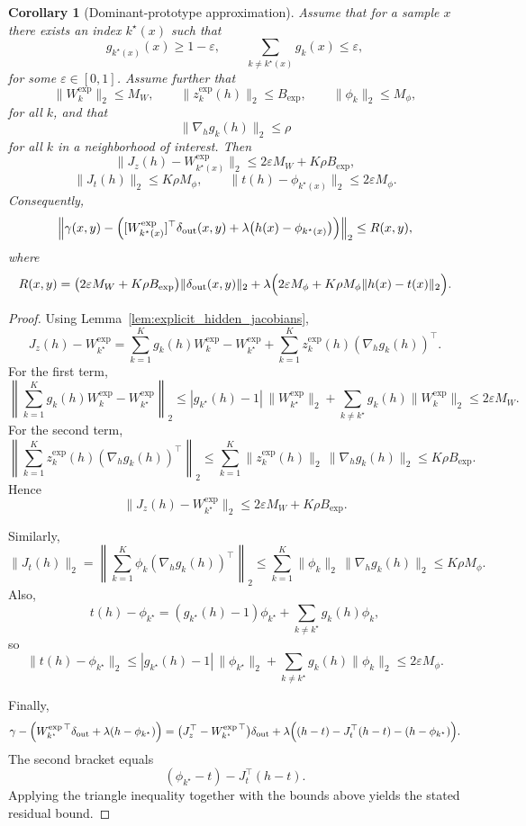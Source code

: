 \documentclass{article}
\newtheorem{cor}[thm]{Corollary}
\theoremstyle{definition}
\theoremstyle{remark}
\begin{document}
\begin{cor}[Dominant-prototype approximation]
\label{cor:dominant_prototype_hidden}
Assume that for a sample \(x\) there exists an index \(k^\star(x)\) such that
\[
g_{k^\star(x)}(x)\ge 1-\varepsilon,
\qquad
\sum_{k\neq k^\star(x)} g_k(x)\le \varepsilon,
\]
for some \(\varepsilon\in[0,1]\). Assume further that
\[
\|W_k^{\mathrm{exp}}\|_2\le M_W,\qquad
\|z_k^{\mathrm{exp}}(h)\|_2\le B_{\mathrm{exp}},\qquad
\|\phi_k\|_2\le M_\phi,
\]
for all \(k\), and that
\[
\|\nabla_h g_k(h)\|_2\le \rho
\]
for all \(k\) in a neighborhood of interest. Then
\[
\|J_z(h)-W_{k^\star(x)}^{\mathrm{exp}}\|_2
\le
2\varepsilon M_W + K\rho B_{\mathrm{exp}},
\]
\[
\|J_t(h)\|_2\le K\rho M_\phi,
\qquad
\|t(h)-\phi_{k^\star(x)}\|_2\le 2\varepsilon M_\phi.
\]
Consequently,
\[
\left\|
\gamma(x,y)
-
\Bigl(
[W_{k^\star(x)}^{\mathrm{exp}}]^\top\delta_{\mathrm{out}}(x,y)
+
\lambda\bigl(h(x)-\phi_{k^\star(x)}\bigr)
\Bigr)
\right\|_2
\le
R(x,y),
\]
where
\[
R(x,y)
=
\bigl(2\varepsilon M_W + K\rho B_{\mathrm{exp}}\bigr)
\|\delta_{\mathrm{out}}(x,y)\|_2
+
\lambda\Bigl(
2\varepsilon M_\phi
+
K\rho M_\phi \|h(x)-t(x)\|_2
\Bigr).
\]
\end{cor}

\begin{proof}
Using Lemma~\ref{lem:explicit_hidden_jacobians},
\[
J_z(h)-W_{k^\star}^{\mathrm{exp}}
=
\sum_{k=1}^K g_k(h)W_k^{\mathrm{exp}}-W_{k^\star}^{\mathrm{exp}}
+
\sum_{k=1}^K z_k^{\mathrm{exp}}(h)(\nabla_h g_k(h))^\top.
\]
For the first term,
\[
\left\|
\sum_{k=1}^K g_k(h)W_k^{\mathrm{exp}}-W_{k^\star}^{\mathrm{exp}}
\right\|_2
\le
|g_{k^\star}(h)-1|\,\|W_{k^\star}^{\mathrm{exp}}\|_2
+
\sum_{k\neq k^\star} g_k(h)\|W_k^{\mathrm{exp}}\|_2
\le 2\varepsilon M_W.
\]
For the second term,
\[
\left\|
\sum_{k=1}^K z_k^{\mathrm{exp}}(h)(\nabla_h g_k(h))^\top
\right\|_2
\le
\sum_{k=1}^K \|z_k^{\mathrm{exp}}(h)\|_2\,\|\nabla_h g_k(h)\|_2
\le K\rho B_{\mathrm{exp}}.
\]
Hence
\[
\|J_z(h)-W_{k^\star}^{\mathrm{exp}}\|_2
\le 2\varepsilon M_W + K\rho B_{\mathrm{exp}}.
\]

Similarly,
\[
\|J_t(h)\|_2
=
\left\|
\sum_{k=1}^K \phi_k(\nabla_h g_k(h))^\top
\right\|_2
\le
\sum_{k=1}^K \|\phi_k\|_2\,\|\nabla_h g_k(h)\|_2
\le K\rho M_\phi.
\]
Also,
\[
t(h)-\phi_{k^\star}
=
(g_{k^\star}(h)-1)\phi_{k^\star}
+
\sum_{k\neq k^\star} g_k(h)\phi_k,
\]
so
\[
\|t(h)-\phi_{k^\star}\|_2
\le
|g_{k^\star}(h)-1|\,\|\phi_{k^\star}\|_2
+
\sum_{k\neq k^\star} g_k(h)\|\phi_k\|_2
\le 2\varepsilon M_\phi.
\]

Finally,
\[
\gamma
-
\Bigl(
W_{k^\star}^{\mathrm{exp}\,\top}\delta_{\mathrm{out}}
+\lambda(h-\phi_{k^\star})
\Bigr)
=
\bigl(J_z^\top-W_{k^\star}^{\mathrm{exp}\,\top}\bigr)\delta_{\mathrm{out}}
+
\lambda\Bigl(
(h-t)-J_t^\top(h-t)-(h-\phi_{k^\star})
\Bigr).
\]
The second bracket equals
\[
(\phi_{k^\star}-t)-J_t^\top(h-t).
\]
Applying the triangle inequality together with the bounds above yields the
stated residual bound.
\end{proof}
\end{document}
